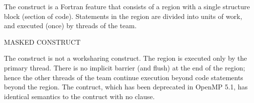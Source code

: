 The  construct is a Fortran feature that consists of a
region with a single structure block (section of code). Statements in the
 region are divided into units of work, and executed (once)
by threads of the team.  

\bigskip
MASKED CONSTRUCT

The  construct is not a worksharing construct.  The  region is
executed only by the primary thread. There is no implicit barrier (and flush) 
at the end of the  region; hence the other threads of the team continue
execution beyond code statements beyond the  region.
The  contruct, which has been deprecated in OpenMP 5.1, has identical semantics
to the  contruct with no  clause.






















